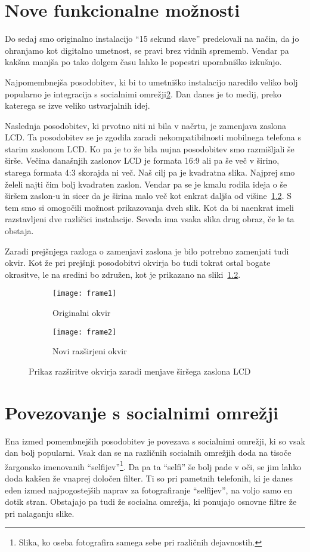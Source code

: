 \chapter{Nove funkcionalne možnosti}
Do sedaj smo originalno instalacijo ``15 sekund slave'' predelovali na način,
da jo ohranjamo kot digitalno umetnost, se pravi brez vidnih sprememb. Vendar
pa kakšna manjša po tako dolgem času lahko le popestri uporabniško izkušnjo.

Najpomembnejša posodobitev, ki bi to umetniško instalacijo naredilo veliko
bolj popularno je integracija s socialnimi omrežji\ref{ch:social_network}.
Dan danes je to medij, preko katerega se izve veliko ustvarjalnih idej.

Naslednja posodobitev, ki prvotno niti ni bila v načrtu, je zamenjava zaslona
LCD. Ta posodobitev se je zgodila zaradi nekompatibilnosti mobilnega telefona
s starim zaslonom LCD. Ko pa je to že bila nujna posodobitev smo razmišljali
še širše. Večina današnjih zaslonov LCD je formata 16:9 ali pa še več v
širino, starega formata 4:3 skorajda ni več. Naš cilj pa je kvadratna slika.
Najprej smo želeli najti čim bolj kvadraten zaslon. Vendar pa se je kmalu
rodila ideja o še širšem zaslon-u in sicer da je širina malo več kot enkrat
daljša od višine~\ref{fig:frame2}. S tem smo si omogočili možnost prikazovanja dveh slik. Kot
da bi naenkrat imeli razstavljeni dve različici instalacije. Seveda ima vsaka
slika drug obraz, če le ta obstaja.

Zaradi prejšnjega razloga o zamenjavi zaslona je bilo potrebno zamenjati tudi
okvir. Kot že pri prejšnji posodobitvi okvirja bo tudi tokrat ostal bogate
okrasitve, le na sredini bo združen, kot je prikazano na
sliki~\ref{fig:frame2}.

\begin{figure}[!ht]
    \centering
    \begin{subfigure}[b]{0.33\textwidth}
        \texttt{[image: frame1]}
        \caption{Originalni okvir}
    \end{subfigure}
    \begin{subfigure}[b]{0.6\textwidth}
        \texttt{[image: frame2]}
        \caption{Novi razširjeni okvir}
        \label{fig:frame2}
    \end{subfigure}
    \caption{Prikaz razširitve okvirja zaradi menjave širšega zaslona LCD}
\end{figure}


\chapter{Povezovanje s socialnimi omrežji}
\label{ch:social_network}
Ena izmed pomembnejših posodobitev je povezava s socialnimi omrežji, ki so
vsak dan bolj popularni. Vsak dan se na različnih socialnih omrežjih doda na
tisoče žargonsko imenovanih ``selfijev''\footnote{Slika, ko oseba fotografira
samega sebe pri različnih dejavnostih.}. Da pa ta ``selfi'' še bolj pade v
oči, se jim lahko doda kakšen že vnaprej določen filter. Ti so pri pametnih
telefonih, ki je danes eden izmed najpogostejših naprav za fotografiranje
``selfijev'', na voljo samo en dotik stran. Obstajajo pa tudi že socialna
omrežja, ki ponujajo osnovne filtre že pri nalaganju slike.

